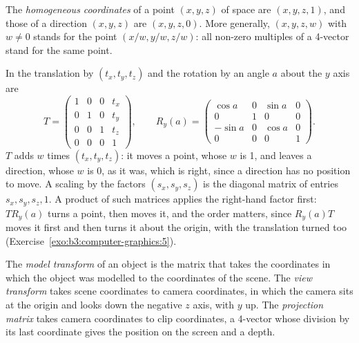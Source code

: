 \begin{definition}\label{def:b3:computer-graphics:homogeneous}
The \emph{homogeneous coordinates} of a point $(x, y, z)$ of space are $(x, y, z, 1)$, and those of a direction $(x, y, z)$ are $(x, y, z, 0)$. More generally, $(x, y, z, w)$ with $w \neq 0$ stands for the point $(x/w, y/w, z/w)$: all non-zero multiples of a 4-vector stand for the same point.
\end{definition}

In  the translation by $(t_x, t_y, t_z)$ and the rotation by an angle $a$ about the $y$ axis are
\[
T = \begin{pmatrix} 1 & 0 & 0 & t_x \\ 0 & 1 & 0 & t_y \\ 0 & 0 & 1 & t_z \\ 0 & 0 & 0 & 1 \end{pmatrix},
\qquad
R_y(a) = \begin{pmatrix} \cos a & 0 & \sin a & 0 \\ 0 & 1 & 0 & 0 \\ -\sin a & 0 & \cos a & 0 \\ 0 & 0 & 0 & 1 \end{pmatrix}.
\]
$T$ adds $w$ times $(t_x, t_y, t_z)$: it moves a point, whose $w$ is 1, and leaves a direction, whose $w$ is 0, as it was, which is right, since a direction has no position to move. A scaling by the factors $(s_x, s_y, s_z)$ is the diagonal matrix of entries $s_x, s_y, s_z, 1$. A product of such matrices applies the right-hand factor first: $T R_y(a)$ turns a point, then moves it, and the order matters, since $R_y(a) T$ moves it first and then turns it about the origin, with the translation turned too (Exercise~\ref{exo:b3:computer-graphics:5}).

\begin{definition}\label{def:b3:computer-graphics:transforms}
The \emph{model transform} of an object is the matrix that takes the coordinates in which the object was modelled to the coordinates of the scene. The \emph{view transform} takes scene coordinates to camera coordinates, in which the camera sits at the origin and looks down the negative $z$ axis, with $y$ up. The \emph{projection matrix} takes camera coordinates to clip coordinates, a 4-vector whose division by its last coordinate gives the position on the screen and a depth.
\end{definition}

